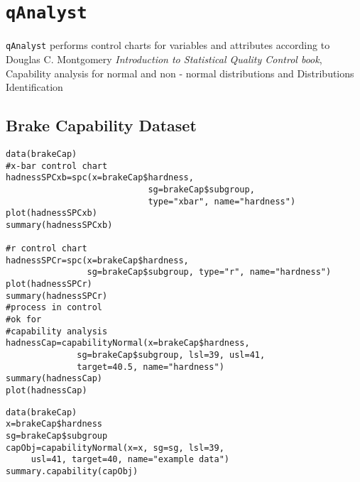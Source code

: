 \documentclass[11pt]{article} %
\begin{document}
\tableofcontents
\section{\texttt{qAnalyst} }
\texttt{qAnalyst} performs control charts for variables and attributes according to Douglas C. Montgomery \textit{Introduction to Statistical Quality Control book}, Capability analysis for normal and non - normal distributions and Distributions Identification

\subsection{Brake Capability Dataset}
\begin{framed}
\begin{verbatim}
data(brakeCap)
#x-bar control chart
hadnessSPCxb=spc(x=brakeCap$hardness,
                            sg=brakeCap$subgroup, 
                            type="xbar", name="hardness")
plot(hadnessSPCxb)
summary(hadnessSPCxb)

#r control chart
hadnessSPCr=spc(x=brakeCap$hardness, 
                sg=brakeCap$subgroup, type="r", name="hardness")
plot(hadnessSPCr)
summary(hadnessSPCr)
#process in control
#ok for
#capability analysis
hadnessCap=capabilityNormal(x=brakeCap$hardness, 
              sg=brakeCap$subgroup, lsl=39, usl=41, 
              target=40.5, name="hardness")
summary(hadnessCap)
plot(hadnessCap)
\end{verbatim}
\end{framed}

\begin{framed}
\begin{verbatim}
data(brakeCap)
x=brakeCap$hardness
sg=brakeCap$subgroup
capObj=capabilityNormal(x=x, sg=sg, lsl=39, 
     usl=41, target=40, name="example data")
summary.capability(capObj)
\end{verbatim}
\end{framed}

\end{document}
